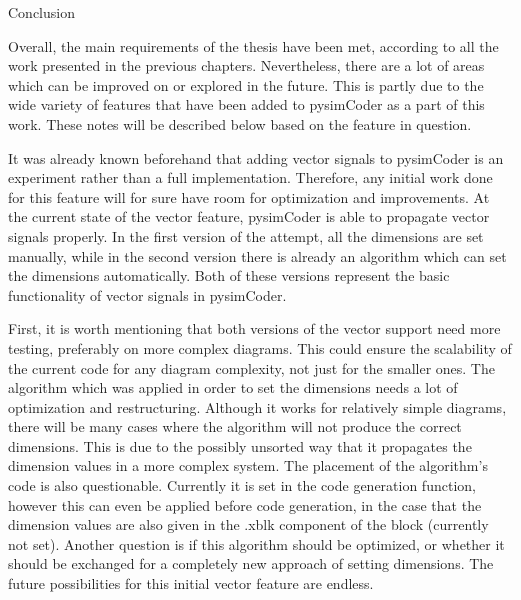 \chap Conclusion

\qquad Overall, the main requirements of the thesis have been met, according to all the work
presented in the previous chapters. Nevertheless, there are a lot of areas which can be
improved on or explored in the future. This is partly due to the wide variety of features
that have been added to pysimCoder as a part of this work. These notes will be described below
based on the feature in question. 

\quad It was already known beforehand that adding vector signals to pysimCoder is an experiment
rather than a full implementation. Therefore, any initial work done for this feature will for
sure have room for optimization and improvements. At the current state of the vector feature,
pysimCoder is able to propagate vector signals properly. In the first version of the attempt,
all the dimensions are set manually, while in the second version there is already an algorithm
which can set the dimensions automatically. Both of these versions represent the basic
functionality of vector signals in pysimCoder.

\quad First, it is worth mentioning that both versions of the vector support need more testing,
preferably on more complex diagrams. This could ensure the scalability of the current code for
any diagram complexity, not just for the smaller ones. The algorithm which was applied in order
to set the dimensions needs a lot of optimization and restructuring. Although it works for
relatively simple diagrams, there will be many cases where the algorithm will not produce the
correct dimensions. This is due to the possibly unsorted way that it propagates the dimension
values in a more complex system. The placement of the algorithm's code is also questionable.
Currently it is set in the code generation function, however this can even be applied before
code generation, in the case that the dimension values are also given in the .xblk component of
the block (currently not set). Another question is if this algorithm should be optimized, or
whether it should be exchanged for a completely new approach of setting dimensions. The future
possibilities for this initial vector feature are endless.

